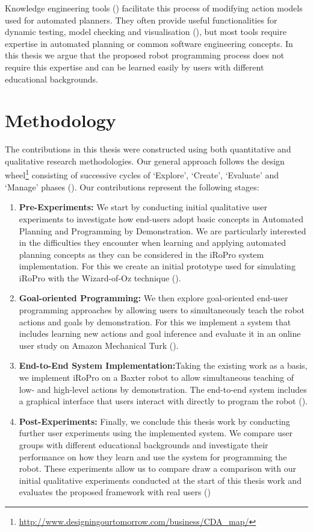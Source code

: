 Knowledge engineering tools () facilitate this process of modifying action models used for automated planners.
They often provide useful functionalities for dynamic testing, model checking and visualisation (\cite{simpson2007planning}), but most tools require expertise in automated planning or common software engineering concepts.
In this thesis we argue that the proposed robot programming process does not require this expertise and can be learned easily by users with different educational backgrounds.


\section{Methodology}
The contributions in this thesis were constructed using both quantitative and qualitative research methodologies.
Our general approach follows the design wheel\footnote{\url{http://www.designingourtomorrow.com/business/CDA_map/}} consisting of successive cycles of `Explore', `Create', `Evaluate' and `Manage' phases ().
Our contributions represent the following stages:
\begin{enumerate}
	\item {\textbf{Pre-Experiments: }We start by conducting initial qualitative user experiments to investigate how end-users adopt basic concepts in Automated Planning and Programming by Demonstration.
	We are particularly interested in the difficulties they encounter when learning and applying automated planning concepts as they can be considered in the iRoPro system implementation.
	For this we create an initial prototype used for simulating iRoPro with the Wizard-of-Oz technique ().
	}
	\item {\textbf{Goal-oriented Programming: }We then explore goal-oriented end-user programming approaches by allowing users to simultaneously teach the robot actions and goals by demonstration.
	For this we implement a system that includes learning new actions and goal inference and evaluate it in an online user study on Amazon Mechanical Turk ().}
	\item {\textbf{End-to-End System Implementation:}Taking the existing work as a basis, we implement iRoPro on a Baxter robot to allow simultaneous teaching of low- and high-level actions by demonstration.
	The end-to-end system includes a graphical interface that users interact with directly to program the robot ().}
	\item {\textbf{Post-Experiments: }Finally, we conclude this thesis work by conducting further user experiments using the implemented system.
		We compare user groups with different educational backgrounds and investigate their performance on how they learn and use the system for programming the robot.
		These experiments allow us to compare draw a comparison with our initial qualitative experiments conducted at the start of this thesis work and evaluates the proposed framework with real users ()}
\end{enumerate}


